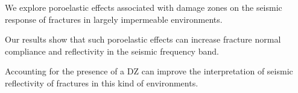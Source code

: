 \documentclass[draft]{agujournal2019}
\begin{document}





\begin{keypoints}
\item We explore poroelastic effects associated with damage zones on the seismic response of fractures in largely impermeable environments.
\item Our results show that such poroelastic effects can increase fracture normal compliance and reflectivity in the seismic frequency band.
\item Accounting for the presence of a DZ can improve the interpretation of seismic reflectivity of fractures in this kind of environments.
\end{keypoints}

%
%

%
%
\end{document}
